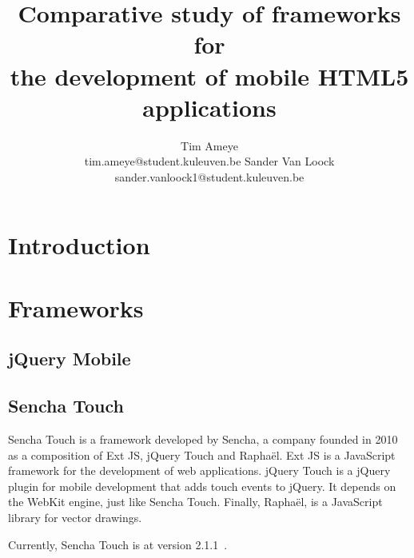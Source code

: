 \documentclass[a4paper]{article}
\title{Comparative study of frameworks for \\ the development of mobile HTML5 applications}
\author{Tim Ameye \\ tim.ameye@student.kuleuven.be \And Sander Van Loock \\ sander.vanloock1@student.kuleuven.be}
\newcommand{\term}[1]{\emph{#1}}
\begin{document}
\maketitle

\begin{abstract}

\end{abstract}

\section{Introduction} %
\label{sec:introduction}

\section{Frameworks} %
\label{sec:frameworks}

\subsection{jQuery Mobile} %
\label{sec:jqm}

\subsection{Sencha Touch} %
\label{sec:sencha_touch}

Sencha Touch is a framework developed by Sencha,  a company founded in 2010 as a composition of Ext JS, jQuery Touch and Raphaël.  Ext JS is a JavaScript framework for the development of web applications.  jQuery Touch is a jQuery plugin for mobile development that adds touch events to jQuery.  It depends on the WebKit engine,  just like Sencha Touch.  Finally,  Raphaël, is a JavaScript library for vector drawings.  

Currently,  Sencha Touch is at version 2.1.1~\cite{Inc.}.

\end{document}
